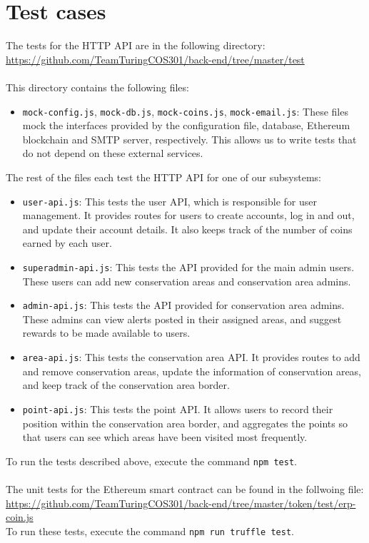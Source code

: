 \documentclass{article}
\begin{document}
\newpage
\section{Test cases}
The tests for the HTTP API are in the following directory:\\
\url{https://github.com/TeamTuringCOS301/back-end/tree/master/test}
\\\\
This directory contains the following files:
\begin{itemize}
\item \texttt{mock-config.js}, \texttt{mock-db.js}, \texttt{mock-coins.js}, \texttt{mock-email.js}: These files mock the interfaces provided by the configuration file, database, Ethereum blockchain and SMTP server, respectively. This allows us to write tests that do not depend on these external services.
\end{itemize}
The rest of the files each test the HTTP API for one of our subsystems:
\begin{itemize}
\item \texttt{user-api.js}: This tests the user API, which is responsible for user management. It provides routes for users to create accounts, log in and out, and update their account details. It also keeps track of the number of coins earned by each user.
\item \texttt{superadmin-api.js}: This tests the API provided for the main admin users. These users can add new conservation areas and conservation area admins.
\item \texttt{admin-api.js}: This tests the API provided for conservation area admins. These admins can view alerts posted in their assigned areas, and suggest rewards to be made available to users.
\item \texttt{area-api.js}: This tests the conservation area API. It provides routes to add and remove conservation areas, update the information of conservation areas, and keep track of the conservation area border.
\item \texttt{point-api.js}: This tests the point API. It allows users to record their position within the conservation area border, and aggregates the points so that users can see which areas have been visited most frequently.
\end{itemize}
To run the tests described above, execute the command \texttt{npm test}.
\\\\
The unit tests for the Ethereum smart contract can be found in the follwoing file:\\
\url{https://github.com/TeamTuringCOS301/back-end/tree/master/token/test/erp-coin.js}\\
To run these tests, execute the command \texttt{npm run truffle test}.
\end{document}
